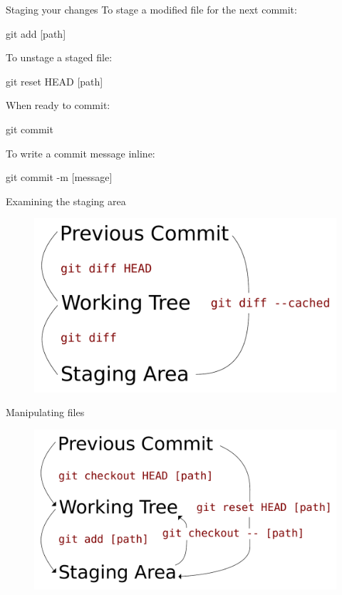 \begin{frame}[fragile]{Staging your changes}
  To stage a modified file for the next commit:

  \begin{gitCommand}git add [path]\end{gitCommand}

  To unstage a staged file:

  \begin{gitCommand}git reset HEAD [path]\end{gitCommand}

  When ready to commit:

  \begin{gitCommand}git commit\end{gitCommand}

  To write a commit message inline:

  \begin{gitCommand}git commit -m [message]\end{gitCommand}

\end{frame}

\begin{frame}{Examining the staging area}
  \begin{figure}
    \includegraphics[scale=0.32]{diffs.pdf}
  \end{figure}
\end{frame}

\begin{frame}{Manipulating files}
  \begin{figure}
    \includegraphics[scale=0.32]{manipulations.pdf}
  \end{figure}
\end{frame}

